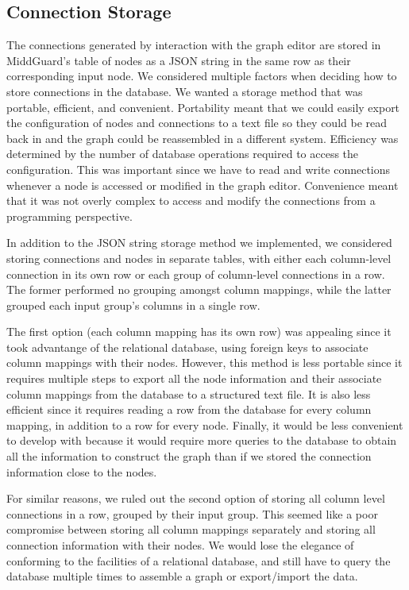 \documentclass[midd]{thesis}
\begin{document}
\subsection{Connection Storage}

The connections generated by interaction with the graph editor are stored in
MiddGuard's table of nodes as a JSON string in the same row as their
corresponding input node. We considered multiple factors when deciding how to
store connections in the database. We wanted a storage method that was portable,
efficient, and convenient. Portability meant that we could easily export the
configuration of nodes and connections to a text file so they could be read back
in and the graph could be reassembled in a different system. Efficiency was
determined by the number of database operations required to access the
configuration. This was important since we have to read and write connections
whenever a node is accessed or modified in the graph editor. Convenience meant
that it was not overly complex to access and modify the connections from a
programming perspective.

In addition to the JSON string storage method we implemented, we considered
storing connections and nodes in separate tables, with either each column-level
connection in its own row or each group of column-level connections in a row.
The former performed no grouping amongst column mappings, while the latter
grouped each input group's columns in a single row.

The first option (each column mapping has its own row) was appealing since it
took advantange of the relational database, using foreign keys to associate
column mappings with their nodes. However, this method is less portable since it
requires multiple steps to export all the node information and their associate
column mappings from the database to a structured text file. It is also less
efficient since it requires reading a row from the database for every column
mapping, in addition to a row for every node. Finally, it would be less
convenient to develop with because it would require more queries to the database
to obtain all the information to construct the graph than if we stored the
connection information close to the nodes.

For similar reasons, we ruled out the second option of storing all column level
connections in a row, grouped by their input group. This seemed like a poor
compromise between storing all column mappings separately and storing all
connection information with their nodes. We would lose the elegance of
conforming to the facilities of a relational database, and still have to query
the database multiple times to assemble a graph or export/import the data.
\end{document}
